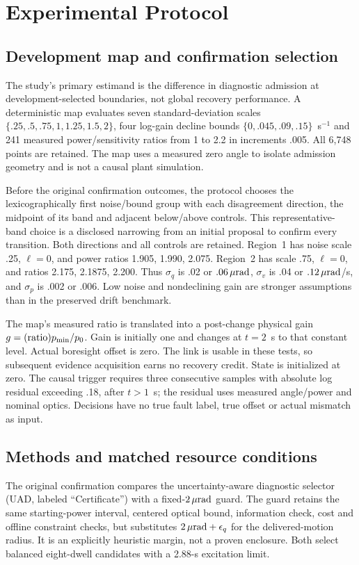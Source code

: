 \section{Experimental Protocol}
\subsection{Development map and confirmation selection}
The study's primary estimand is the difference in diagnostic admission at development-selected boundaries, not global recovery performance. A deterministic map evaluates seven standard-deviation scales $\{.25,.5,.75,1,1.25,1.5,2\}$, four log-gain decline bounds $\{0,.045,.09,.15\}$~s$^{-1}$ and 241 measured power/sensitivity ratios from 1 to 2.2 in increments .005. All 6,748 points are retained. The map uses a measured zero angle to isolate admission geometry and is not a causal plant simulation.

Before the original confirmation outcomes, the protocol chooses the lexicographically first noise/bound group with each disagreement direction, the midpoint of its band and adjacent below/above controls. This representative-band choice is a disclosed narrowing from an initial proposal to confirm every transition. Both directions and all controls are retained. Region~1 has noise scale .25, $\ell=0$, and power ratios 1.905, 1.990, 2.075. Region~2 has scale .75, $\ell=0$, and ratios 2.175, 2.1875, 2.200. Thus $\sigma_q$ is .02 or $.06\,\mu\mathrm{rad}$, $\sigma_v$ is .04 or $.12\,\mu\mathrm{rad}$/s, and $\sigma_p$ is .002 or .006. Low noise and nondeclining gain are stronger assumptions than in the preserved drift benchmark.

The map's measured ratio is translated into a post-change physical gain $g=({\rm ratio})p_{\min}/p_0$. Gain is initially one and changes at $t=2$~s to that constant level. Actual boresight offset is zero. The link is usable in these tests, so subsequent evidence acquisition earns no recovery credit. State is initialized at zero. The causal trigger requires three consecutive samples with absolute log residual exceeding .18, after $t>1$~s; the residual uses measured angle/power and nominal optics. Decisions have no true fault label, true offset or actual mismatch as input.

\subsection{Methods and matched resource conditions}
The original confirmation compares the uncertainty-aware diagnostic selector (UAD, labeled ``Certificate'') with a fixed-$2\,\mu\mathrm{rad}$ guard. The guard retains the same starting-power interval, centered optical bound, information check, cost and offline constraint checks, but substitutes $2\,\mu\mathrm{rad}+\epsilon_q$ for the delivered-motion radius. It is an explicitly heuristic margin, not a proven enclosure. Both select balanced eight-dwell candidates with a 2.88-s excitation limit.

